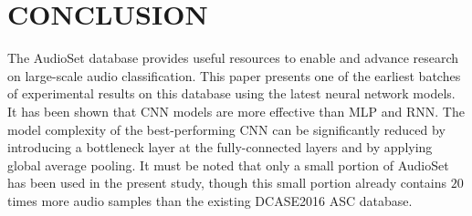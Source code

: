 \documentclass{article}
\begin{document}
\section{CONCLUSION}
\label{sec:conclusion}

The AudioSet database provides useful resources to enable and advance research on large-scale audio classification. This paper presents one of the earliest batches of experimental results on this database using the latest neural network models. It has been shown that CNN models are more effective than MLP and RNN. The model complexity of the best-performing CNN can be significantly reduced by introducing a bottleneck layer at the fully-connected layers and by applying global average pooling. It must be noted that only a small portion of AudioSet has been used in the present study, though this small portion already contains $20$ times more audio samples than the existing DCASE2016 ASC database.








\end{document}
